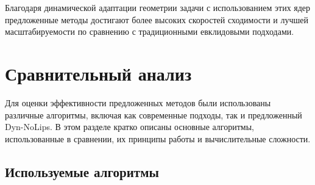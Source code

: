 \documentclass[a4paper,11pt]{article}
\begin{document}
Благодаря динамической адаптации геометрии задачи с использованием этих ядер предложенные методы достигают более высоких скоростей сходимости и лучшей масштабируемости по сравнению с традиционными евклидовыми подходами.

\section{Сравнительный анализ}

Для оценки эффективности предложенных методов были использованы различные алгоритмы,
включая как современные подходы, так и предложенный Dyn-NoLips. В этом разделе кратко описаны
основные алгоритмы, использованные в сравнении, их принципы работы и вычислительные сложности.

\subsection{Используемые алгоритмы}
\end{document}
